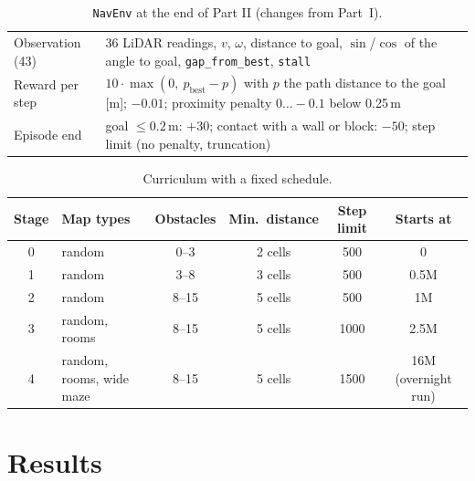\documentclass[11pt,a4paper]{article}
\newcommand{\code}[1]{\texttt{#1}}
\begin{document}
\begin{table}[H]
      \centering\small
      \begin{tabularx}{\textwidth}{@{}l X@{}}
            \toprule
            Observation (43) & 36 LiDAR readings, $v$, $\omega$, distance to goal, $\sin$/$\cos$ of the angle to goal, \code{gap\_from\_best}, \code{stall}          \\
            Reward per step  & $10\cdot\max(0,\ p_\text{best}-p)$ with $p$ the path distance to the goal [m]; $-0.01$; proximity penalty $0\ldots-0.1$ below 0.25\,m \\
            Episode end      & goal $\le 0.2$\,m: $+30$; contact with a wall or block: $-50$; step limit (no penalty, truncation)                                    \\
            \bottomrule
      \end{tabularx}
      \caption{\code{NavEnv} at the end of Part II (changes from Part~I).}
\end{table}

\begin{table}[H]
      \centering\small
      \begin{tabular}{@{}c l c c c c@{}}
            \toprule
            Stage & Map types                & Obstacles & Min.\ distance & Step limit & Starts at           \\
            \midrule
            0     & random                   & 0--3      & 2 cells        & 500        & 0                   \\
            1     & random                   & 3--8      & 3 cells        & 500        & 0.5M                \\
            2     & random                   & 8--15     & 5 cells        & 500        & 1M                  \\
            3     & random, rooms            & 8--15     & 5 cells        & 1000       & 2.5M                \\
            4     & random, rooms, wide maze & 8--15     & 5 cells        & 1500       & 16M (overnight run) \\
            \bottomrule
      \end{tabular}
      \caption{Curriculum with a fixed schedule.}
      \label{tab:curriculum2}
\end{table}

\section{Results}
\end{document}
